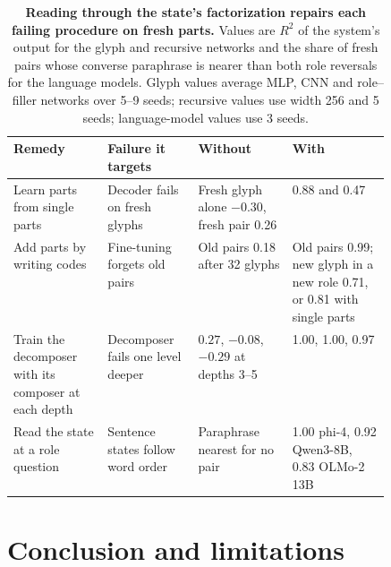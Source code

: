 \documentclass[10pt]{article}
\theoremstyle{plain}
\theoremstyle{remark}
\begin{document}
\begin{table}[t]
  \caption{\textbf{Reading through the state's factorization repairs each failing procedure on fresh parts.} Values are $R^2$ of the system's output for the glyph and recursive networks and the share of fresh pairs whose converse paraphrase is nearer than both role reversals for the language models. Glyph values average MLP, CNN and role--filler networks over 5--9 seeds; recursive values use width 256 and 5 seeds; language-model values use 3 seeds.}
  \label{tab:remedies}
  \centering\small
  \begin{tabularx}{\linewidth}{@{}P{0.25\linewidth}P{0.24\linewidth}YY@{}}
    \toprule
    Remedy & Failure it targets & Without & With \\
    \midrule
    Learn parts from single parts & Decoder fails on fresh glyphs & Fresh glyph alone $-0.30$, fresh pair 0.26 & 0.88 and 0.47 \\
    Add parts by writing codes & Fine-tuning forgets old pairs & Old pairs 0.18 after 32 glyphs & Old pairs 0.99; new glyph in a new role 0.71, or 0.81 with single parts \\
    Train the decomposer with its composer at each depth & Decomposer fails one level deeper & $0.27$, $-0.08$, $-0.29$ at depths 3--5 & 1.00, 1.00, 0.97 \\
    Read the state at a role question & Sentence states follow word order & Paraphrase nearest for no pair & 1.00 phi-4, 0.92 Qwen3-8B, 0.83 OLMo-2 13B \\
    \bottomrule
  \end{tabularx}
\end{table}

\section{Conclusion and limitations}
\label{sec:discussion}
\end{document}
